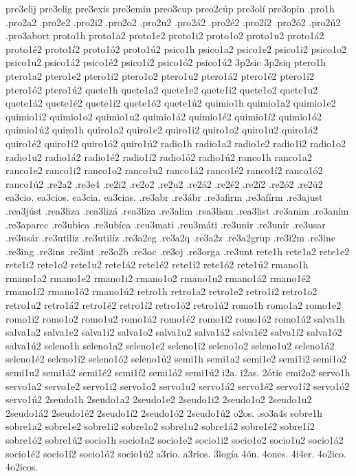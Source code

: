 {pre3elij
pre3elig
pre3exis
pre3emin
preo3cup
preo2cúp
pre3olí
pre3opin
.pro1h
.pro2a2 .pro2e2 .pro2i2 .pro2o2 .pro2u2
.pro2á2 .pro2é2 .pro2í2 .pro2ó2 .pro2ú2
.pro3abort
proto1h
proto1a2 proto1e2 proto1i2 proto1o2 proto1u2
proto1á2 proto1é2 proto1í2 proto1ó2 proto1ú2
psico1h
psico1a2 psico1e2 psico1i2 psico1o2 psico1u2
psico1á2 psico1é2 psico1í2 psico1ó2 psico1ú2
3p2sic
3p2siq
ptero1h
ptero1a2 ptero1e2 ptero1i2 ptero1o2 ptero1u2
ptero1á2 ptero1é2 ptero1í2 ptero1ó2 ptero1ú2
quete1h
quete1a2 quete1e2 quete1i2 quete1o2 quete1u2
quete1á2 quete1é2 quete1í2 quete1ó2 quete1ú2
quimio1h
quimio1a2 quimio1e2 quimio1i2 quimio1o2 quimio1u2
quimio1á2 quimio1é2 quimio1í2 quimio1ó2 quimio1ú2
quiro1h
quiro1a2 quiro1e2 quiro1i2 quiro1o2 quiro1u2
quiro1á2 quiro1é2 quiro1í2 quiro1ó2 quiro1ú2
radio1h
radio1a2 radio1e2 radio1i2 radio1o2 radio1u2
radio1á2 radio1é2 radio1í2 radio1ó2 radio1ú2
ranco1h
ranco1a2 ranco1e2 ranco1i2 ranco1o2 ranco1u2
ranco1á2 ranco1é2 ranco1í2 ranco1ó2 ranco1ú2
.re2a2
.re3e4
.re2i2
.re2o2
.re2u2
.re2á2
.re2é2
.re2í2
.re2ó2
.re2ú2
ea3cio.
ea3cios.
ea3cia.
ea3cias.
.re3abr
.re3ábr
.re3afirm
.re3afírm
.re3ajust
.rea3júst
.rea3liza
.rea3lizá
.rea3líza
.re3alim
.rea3lism
.rea3list
.re3anim
.re3aním
.re3aparec
.re3ubica
.re3ubíca
.reu3mati
.reu3máti
.re3unir
.re3unír
.re3usar
.re3usár
.re3utiliz
.re3utilíz
.re3a2eg
.re3a2q
.re3a2z
.re3a2grup
.re3i2m
.re3inc
.re3ing
.re3ins
.re3int
.re3o2b
.re3oc
.re3oj
.re3orga
.re3unt
rete1h
rete1a2 rete1e2 rete1i2 rete1o2 rete1u2
rete1á2 rete1é2 rete1í2 rete1ó2 rete1ú2
rmano1h
rmano1a2 rmano1e2 rmano1i2 rmano1o2 rmano1u2
rmano1á2 rmano1é2 rmano1í2 rmano1ó2 rmano1ú2
retro1h
retro1a2 retro1e2 retro1i2 retro1o2 retro1u2
retro1á2 retro1é2 retro1í2 retro1ó2 retro1ú2
romo1h
romo1a2 romo1e2 romo1i2 romo1o2 romo1u2
romo1á2 romo1é2 romo1í2 romo1ó2 romo1ú2
salva1h
salva1a2 salva1e2 salva1i2 salva1o2 salva1u2
salva1á2 salva1é2 salva1í2 salva1ó2 salva1ú2
seleno1h
seleno1a2 seleno1e2 seleno1i2 seleno1o2 seleno1u2
seleno1á2 seleno1é2 seleno1í2 seleno1ó2 seleno1ú2
semi1h
semi1a2 semi1e2 semi1i2 semi1o2 semi1u2
semi1á2 semi1é2 semi1í2 semi1ó2 semi1ú2
i2a.
i2as.
2ótic
emi2o2
servo1h
servo1a2 servo1e2 servo1i2 servo1o2 servo1u2
servo1á2 servo1é2 servo1í2 servo1ó2 servo1ú2
2seudo1h
2seudo1a2 2seudo1e2 2seudo1i2 2seudo1o2 2seudo1u2
2seudo1á2 2seudo1é2 2seudo1í2 2seudo1ó2 2seudo1ú2
o2os.
.so3a4s
sobre1h
sobre1a2 sobre1e2 sobre1i2 sobre1o2 sobre1u2
sobre1á2 sobre1é2 sobre1í2 sobre1ó2 sobre1ú2
socio1h
socio1a2 socio1e2 socio1i2 socio1o2 socio1u2
socio1á2 socio1é2 socio1í2 socio1ó2 socio1ú2
a3rio.
a3rios.
3logía
4ón.
4ones.
4i4er.
4o2ico.
4o2icos.
}

